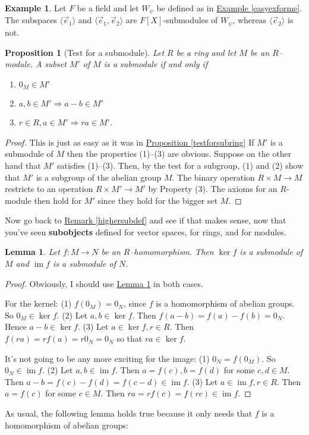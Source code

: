 \documentclass[11pt]{amsbook}
\DeclareMathOperator{\im}{\mathrm{im}}
\newtheorem{lemma}[theorem]{Lemma}
\newtheorem{proposition}[theorem]{Proposition}
\theoremstyle{definition}
\newtheorem{ex}[theorem]{Example}
\begin{document}
\begin{ex}
Let $F$ be a field and let $W_{\psi}$ be defined as in \hyperref[easyexforme]{Example \ref{easyexforme}}. The subspaces $\langle \vec{e}_1 \rangle$ and $\langle \vec{e}_1, \vec{e}_2 \rangle$ are $F[X]$-submodules of $W_{\psi}$, whereas $\langle \vec{e}_2 \rangle$ is not.
\end{ex}
\begin{proposition}[Test for a submodule] \label{testforsubmod} Let $R$ be a ring and let $M$ be an $R$--module. A
subset $M'$ of $M$ is a {\it submodule} if and only if
\begin{enumerate} \item $0_M \in M'$
\item $a,b\in M' \Rightarrow a-b\in M'$ \item $r\in R, a\in
M' \Rightarrow ra\in M'$.
\end{enumerate}
\end{proposition}
\begin{proof} This is just as easy as it was in \hyperref[testforsubring]{Proposition \ref{testforsubring}} If $M'$ is a submodule of $M$ then the properties (1)--(3) are obvious. Suppose on the other hand that $M'$ satisfies (1)--(3). Then, by the test for a subgroup, (1) and (2) show that $M'$ is a subgroup of the abelian group $M$. The binary operation $R\times M\to M$ restricts to an operation $R\times M' \to M'$ by Property (3). The axioms for an $R$-module then hold for $M'$ since they hold for the bigger set $M$.\end{proof}

Now go back to \hyperref[highersubdef]{Remark \ref{highersubdef}} and see if that makes sense, now that you've seen {\bf subobjects} defined for vector spaces, for rings, and for modules.

\begin{lemma} Let $f:M\to N$ be an $R$--homomorphism.
Then $\ker f$ is a submodule of $M$ and $\im f$ is a submodule of $N$.
\end{lemma}

\begin{proof} Obviously, I should use \hyperref[testforsubmod]{Lemma \ref{testforsubmod}} in both cases.

For the kernel: (1) $f(0_M) = 0_N$, since $f$ is a homomorphism of abelian groups. So $0_M \in \ker f$.
(2) Let $a,b\in \ker f$. Then $f (a-b) = f(a) -
f(b) =  0_N.$ Hence $a-b\in \ker f$.
(3) Let $a\in \ker f, r\in R$. Then $f (ra) = rf(a) =
r0_N = 0_N$ so that $ra\in \ker f$.

It's not going to be any more exciting for the image: (1) $0_N = f (0_M)$. So $0_N \in \im f$.
(2) Let $a,b\in \im f$. Then $a = f(c), b= f(d)$ for
some $c,d\in M$. Then $a-b = f(c) - f(d) = f(c-d)
\in \im f.$
(3) Let $a\in \im f, r\in R$. Then $a=f(c)$ for some
$c\in M$. Then $ra = rf (c) = f (rc) \in \im f.$
\end{proof}
As usual, the following lemma holds true because it only needs that $f$ is a homomorphism of abelian groups:
\end{document}
